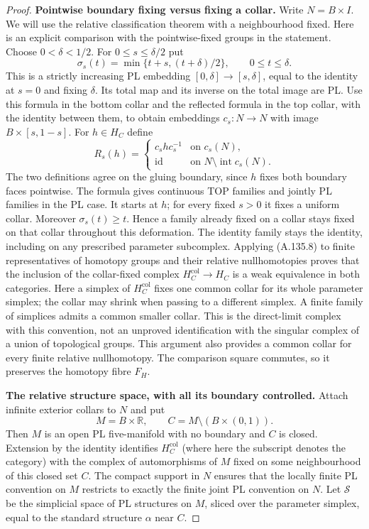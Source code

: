 \begin{proof}
\textbf{Pointwise boundary fixing versus fixing a collar.}
Write $N=B\times I$. We will use the relative classification theorem
with a neighbourhood fixed. Here is an explicit comparison with the
pointwise-fixed groups in the statement. Choose $0<\delta<1/2$.
For $0\le s\le\delta/2$ put
\[
 \sigma_s(t)=\min\{t+s,(t+\delta)/2\},\qquad 0\le t\le\delta.
                                                        \tag{A.135.7}
\]
This is a strictly increasing PL embedding $[0,\delta]\to[s,\delta]$,
equal to the identity at $s=0$ and fixing $\delta$. Its total map and
its inverse on the total image are PL. Use this formula in the bottom
collar and the reflected formula in the top collar, with the identity
between them, to obtain embeddings $c_s:N\to N$ with image
$B\times[s,1-s]$.
For $h\in H_C$ define
\[
 R_s(h)=
 \begin{cases}
 c_s h c_s^{-1}&\text{on }c_s(N),\\
 \operatorname{id}&\text{on }N\setminus\operatorname{int}c_s(N).
 \end{cases}                                           \tag{A.135.8}
\]
The two definitions agree on the gluing boundary, since $h$ fixes
both boundary faces pointwise. The formula gives continuous TOP
families and jointly PL families in the PL case. It starts at $h$;
for every fixed $s>0$ it fixes a uniform collar.
Moreover $\sigma_s(t)\ge t$. Hence a family already fixed on a
collar stays fixed on that collar throughout this deformation.
The identity family stays the identity, including on any prescribed
parameter subcomplex. Applying (A.135.8) to finite representatives of
homotopy groups and their relative nullhomotopies proves that the
inclusion of the collar-fixed complex $H_C^{\mathrm{col}}\to H_C$
is a weak equivalence in both categories. Here a simplex of
$H_C^{\mathrm{col}}$ fixes one common collar for its whole parameter
simplex; the collar may shrink when passing to a different simplex.
A finite family of simplices admits a common smaller collar. This is
the direct-limit complex with this convention, not an unproved
identification with the singular complex of a union of topological
groups. This argument also provides a common collar for every finite
relative nullhomotopy. The comparison
square commutes, so it preserves the homotopy fibre $F_H$.

\textbf{The relative structure space, with all its boundary controlled.}
Attach infinite exterior collars to $N$ and put
\[
 M=B\times\mathbb R,\qquad
 C=M\setminus(B\times(0,1)).
\]
Then $M$ is an open PL five-manifold with no boundary and $C$ is closed.
Extension by the identity identifies $H_C^{\mathrm{col}}$ (where here
the subscript denotes the category) with the complex of automorphisms
of $M$ fixed on some neighbourhood of this closed set $C$.
The compact support in $N$ ensures that the locally finite PL convention
on $M$ restricts to exactly the finite joint PL convention on $N$.
Let $\mathcal S$ be the simplicial space of PL structures on $M$,
sliced over the parameter simplex, equal to the standard structure
$\alpha$ near $C$.


\end{proof}
